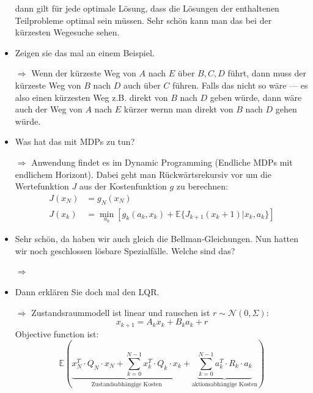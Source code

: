 \documentclass[a4paper]{article}
\begin{document}
\begin{itemize}
              dann gilt für jede optimale Lösung, dass die Lösungen der
              enthaltenen Teilprobleme optimal sein müssen. Sehr schön kann
              man das bei der kürzesten Wegesuche sehen.
        \item Zeigen sie das mal an einem Beispiel.
        \item[$\Rightarrow$] Wenn der kürzeste Weg von $A$ nach $E$ über
             $B, C, D$ führt, dann muss der kürzeste Weg von $B$ nach $D$ auch
             über $C$ führen. Falls das nicht so wäre --- es also einen
             kürzesten Weg z.B. direkt von $B$ nach $D$ geben würde, dann wäre
             auch der Weg von $A$ nach $E$ kürzer wernn man direkt von $B$ nach
             $D$ gehen würde.
        \item Was hat das mit MDPs zu tun?
        \item[$\Rightarrow$] Anwendung findet es im Dynamic Programming
             (Endliche MDPs mit endlichem Horizont). Dabei geht man Rückwärtsrekursiv
             vor um die Wertefunktion $J$ aus der Kostenfunktion $g$ zu berechnen:
             \begin{align}
             J(x_N) &= g_N(x_N)\\
             J(x_k) &= \min_{a_k} \left [ g_k(a_k, x_k) + \mathbb{E}\{J_{k+1}(x_k+1) | x_k, a_k\} \right]
             \end{align}
        \item Sehr schön, da haben wir auch gleich die Bellman-Gleichungen.
              Nun hatten wir noch geschlossen lösbare Spezialfälle. Welche
              sind das?
        \item[$\Rightarrow$] 
        \item Dann erklären Sie doch mal den LQR.
        \item[$\Rightarrow$]
        Zustandsraummodell ist linear und rauschen ist $r \sim \mathcal{N}(0, \Sigma)$:
        $$x_{k+1} = A_k x_k + B_k a_k + r$$
        Objective function ist:
        $$\mathbb{E} \left ( \underbrace{x_N^T \cdot Q_N \cdot x_N + \sum_{k=0}^{N-1} x_k^T \cdot Q_k \cdot x_k}_{\text{Zustandsabhängige Kosten}} + \underbrace{\sum_{k=0}^{N-1} a_k^T \cdot R_k \cdot a_k}_{\text{aktionsabhängige Kosten}} \right )$$

\end{itemize}
\end{document}
